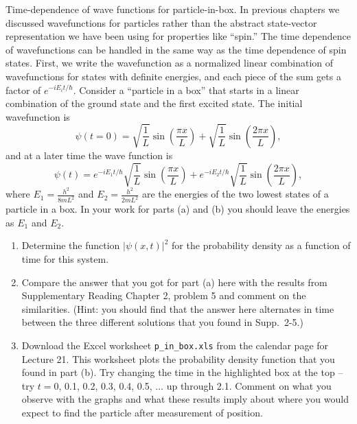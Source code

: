 \newpage

\begin{aproblem}{Time-dependence of wave functions for particle-in-box.}
  In previous chapters we discussed wavefunctions for particles rather
  than the abstract state-vector representation we have been using for
  properties like ``spin.''  The time dependence of wavefunctions can
  be handled in the same way as the time dependence of spin states.
  First, we write the wavefunction as a normalized linear combination
  of wavefunctions for states with definite energies, and each piece
  of the sum gets a factor of $e^{-iE_it/\hbar}$.  Consider a
  ``particle in a box'' that starts in a linear combination of the
  ground state and the first excited state.  The initial wavefunction
  is
  \[ \psi(t=0) =
  \sqrt{\frac{1}{L}}\sin\left(\frac{\pi x}{L}\right)+
  \sqrt{\frac{1}{L}}\sin\left(\frac{2\pi x}{L}\right), \]
  and at a later time the wave function is
  \[ \psi(t) = 
  e^{-iE_1t/\hbar}\sqrt{\frac{1}{L}}\sin\left(\frac{\pi x}{L}\right)+
  e^{-iE_2t/\hbar}\sqrt{\frac{1}{L}}\sin\left(\frac{2\pi
    x}{L}\right), \] 
  where $E_1 = \frac{h^2}{8mL^2}$ and $E_2 = \frac{h^2}{2mL^2}$ are
  the energies of the two lowest states of a particle in a box. In
  your work for parts (a) and (b) you should leave the energies as
  $E_1$ and $E_2$.

  \begin{enumerate}

  \item Determine the function $|\psi(x,t)|^2$ for the probability
    density as a function of time for this system.

  \item Compare the answer that you got for part (a) here with the
    results from Supplementary Reading Chapter 2, problem 5 and
    comment on the similarities.  (Hint: you should find that the
    answer here alternates in time between the three different
    solutions that you found in Supp.~2-5.)

  \item Download the Excel worksheet \verb+p_in_box.xls+ from the
    calendar page for Lecture 21.  This worksheet plots the
    probability density function that you found in part (b).  Try
    changing the time in the highlighted box at the top -- try $t =
    0$, 0.1, 0.2, 0.3, 0.4, 0.5, $\dots$ up through 2.1.  Comment on
    what you observe with the graphs and what these results imply
    about where you would expect to find the particle after
    measurement of position.
  \end{enumerate}
  \label{prob:time_dependent_wavefunctions}
\end{aproblem}

